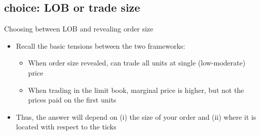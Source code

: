 \documentclass[english,10pt]{beamer}
\begin{document}
\subsection{choice: LOB or trade size} 

\begin{frame}{Choosing between LOB and revealing order size}
	\begin{itemize}
		\item Recall the basic tensions between the two frameworks: 
		\pause
		\begin{itemize}
			\item When order size revealed, can trade all units at single (low-moderate) price
			\pause
			\item When trading in the limit book, marginal price is higher, but not the prices paid on the first units
		\end{itemize}
		\pause
		\item Thus, the answer will depend on (i) the size of your order and (ii) where it is located with respect to the ticks
	\end{itemize}
\end{frame}
\end{document}
